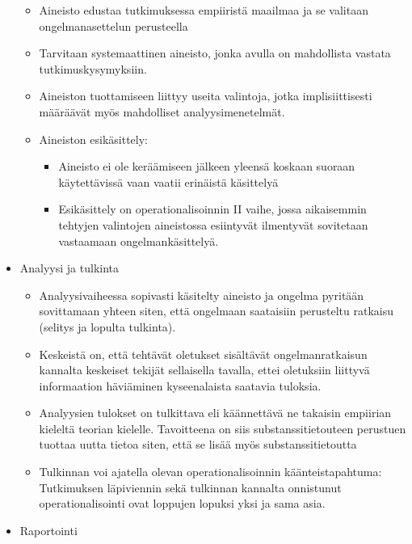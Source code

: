 \documentclass[
]{book}
\providecommand{\tightlist}{%
  \setlength{\itemsep}{0pt}\setlength{\parskip}{0pt}}
\begin{document}
\begin{itemize}
  \begin{itemize}
  \tightlist
  \item
    Aineisto edustaa tutkimuksessa empiiristä maailmaa ja se valitaan ongelmanasettelun perusteella
  \item
    Tarvitaan systemaattinen aineisto, jonka avulla on mahdollista vastata tutkimuskysymyksiin.
  \item
    Aineiston tuottamiseen liittyy useita valintoja, jotka implisiittisesti määräävät myös mahdolliset analyysimenetelmät.
  \item
    Aineiston esikäsittely:

    \begin{itemize}
    \tightlist
    \item
      Aineisto ei ole keräämiseen jälkeen yleensä koskaan suoraan käytettävissä vaan vaatii erinäistä käsittelyä
    \item
      Esikäsittely on operationalisoinnin II vaihe, jossa aikaisemmin tehtyjen valintojen aineistossa esiintyvät ilmentyvät sovitetaan vastaamaan ongelmankäsittelyä.
    \end{itemize}
  \end{itemize}
\item
  Analyysi ja tulkinta

  \begin{itemize}
  \tightlist
  \item
    Analyysivaiheessa sopivasti käsitelty aineisto ja ongelma pyritään sovittamaan yhteen siten, että ongelmaan saataisiin perusteltu ratkaisu (selitys ja lopulta tulkinta).
  \item
    Keskeistä on, että tehtävät oletukset sisältävät ongelmanratkaisun kannalta keskeiset tekijät sellaisella tavalla, ettei oletuksiin liittyvä informaation häviäminen kyseenalaista saatavia tuloksia.
  \item
    Analyysien tulokset on tulkittava eli käännettävä ne takaisin empiirian kieleltä teorian kielelle. Tavoitteena on siis substanssitietouteen perustuen tuottaa uutta tietoa siten, että se lisää myös substanssitietoutta
  \item
    Tulkinnan voi ajatella olevan operationalisoinnin käänteistapahtuma: Tutkimuksen läpiviennin sekä tulkinnan kannalta onnistunut operationalisointi ovat loppujen lopuksi yksi ja sama asia.
  \end{itemize}
\item
  Raportointi


\end{itemize}
\end{document}
